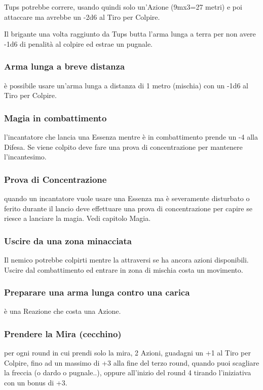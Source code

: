\documentclass[a4paper,11pt,twoside,openany]{book}
\begin{document}
Tups potrebbe correre, usando quindi solo un'Azione (9mx3=27 metri) e poi attaccare ma avrebbe un -2d6 al Tiro per Colpire.

Il brigante una volta raggiunto da Tups butta l'arma lunga a terra per non avere -1d6 di penalità al colpire ed estrae un pugnale.

\subsubsection{Arma lunga a breve distanza} è possibile usare un'arma lunga a distanza di 1 metro (mischia) con un -1d6 al Tiro per Colpire.

\subsubsection{Magia in combattimento} l'incantatore che lancia una Essenza mentre è in combattimento prende un -4 alla Difesa. Se viene colpito deve fare una prova di concentrazione per mantenere l'incantesimo.

\subsubsection{Prova di Concentrazione} quando un incantatore vuole usare una Essenza ma è severamente disturbato o ferito durante il lancio deve effettuare una prova di concentrazione per capire se riesce a lanciare la magia. Vedi capitolo Magia.

\subsubsection{Uscire da una zona minacciata} Il nemico potrebbe colpirti mentre la attraversi se ha ancora azioni disponibili. Uscire dal combattimento ed entrare in zona di mischia costa un movimento.

\subsubsection{Preparare una arma lunga contro una carica} è una Reazione che costa una Azione.

\subsubsection{Prendere la Mira (cecchino)} per ogni round in cui prendi solo la mira, 2 Azioni, guadagni un +1 al Tiro per Colpire, fino ad un massimo di +3 alla fine del terzo round, quando puoi scagliare la freccia (o dardo o pugnale..), oppure all'inizio del round 4 tirando l'iniziativa con un bonus di +3.
\end{document}
